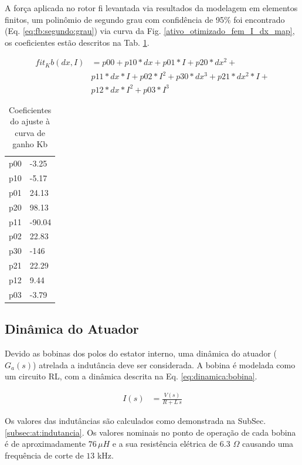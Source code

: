 A força aplicada no rotor fi levantada via resultados da modelagem em elementos
finitos, um polinômio de segundo grau com confidência de 95\% foi encontrado
(Eq. \ref{eq:fb:segundo:grau}) via curva da Fig.
\ref{ativo_otimizado_fem_I_dx_map}, os coeficientes estão descritos na Tab. \ref{tab:dinamico:ajuste:kb}.

\begin{align}
     fit_Kb(dx,I) &= p00 + p10*dx + p01*I + p20*dx^2 +\\
     & p11*dx*I + p02*I^2 + p30*dx^3 + p21*dx^2*I +\\
     & p12*dx*I^2 + p03*I^3
     \label{eq:fb:segundo:grau}
\end{align}

\begin{table}[ht!]
\centering
\begin{tabular}{c l}
	   p00 & -3.25\\
	   p10 & -5.17\\
	   p01 &  24.13\\
	   p20 &   98.13\\
	   p11 & -90.04\\
	   p02 &  22.83\\
	   p30 &   -146\\
	   p21 &  22.29\\
	   p12 &  9.44	\\
	   p03 & -3.79
\end{tabular} 
\caption{Coeficientes do ajuste à curva de ganho Kb}
\label{tab:dinamico:ajuste:kb}
\end{table}

\subsection{Dinâmica do Atuador}

Devido as bobinas dos polos do estator interno, uma dinâmica do atuador ($G_a(s)$) atrelada a indutância deve ser considerada. A bobina é modelada como um circuito RL, com a dinâmica descrita na Eq. \eqref{eq:dinamica:bobina}.

\begin{align}
	I(s) &= \frac{V(s)}{R + L \, s} 
	\label{eq:dinamica:bobina}
\end{align}

Os valores das indutâncias são calculados como demonstrada na SubSec. \ref{subsec:at:indutancia}. Os valores nominais no ponto de operação de cada bobina é de aproximadamente $76 \, \mu H$ e a sua resistência elétrica de 6.3 $\Omega$ causando uma frequência de corte de $13$ kHz. 

